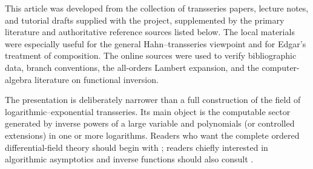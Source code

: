 \documentclass[11pt,openany]{book}
\theoremstyle{definition}
\theoremstyle{plain}
\theoremstyle{remark}
\begin{document}
This article was developed from the collection of transseries papers, lecture
notes, and tutorial drafts supplied with the project, supplemented by the
primary literature and authoritative reference sources listed below.  The local
materials were especially useful for the general Hahn--transseries viewpoint
and for Edgar's treatment of composition.  The online sources were used to
verify bibliographic data, branch conventions, the all-orders Lambert
expansion, and the computer-algebra literature on functional inversion.

The presentation is deliberately narrower than a full construction of the
field of logarithmic--exponential transseries.  Its main object is the
computable sector generated by inverse powers of a large variable and
polynomials (or controlled extensions) in one or more logarithms.  Readers who
want the complete ordered differential-field theory should begin with
\cite{edgar-beginners,vdhoeven-book,adh-book}; readers chiefly interested in
algorithmic asymptotics and inverse functions should also consult
\cite{salvy-fast,salvy-shackell,rssv-exp-log}.
\end{document}
